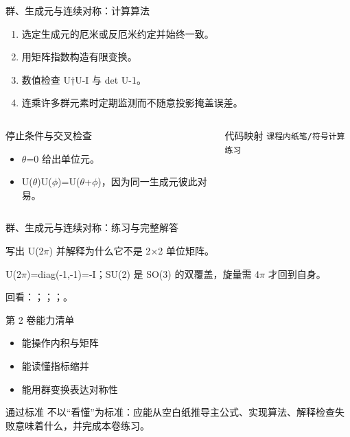 \begin{frame}[t]{群、生成元与连续对称：计算算法}
\footnotesize
{}\begin{enumerate}
\item 选定生成元的厄米或反厄米约定并始终一致。
\item 用矩阵指数构造有限变换。
\item 数值检查 U†U-I 与 det U-1。
\item 连乘许多群元素时定期监测而不随意投影掩盖误差。
\end{enumerate}\begin{columns}[T,onlytextwidth]
\begin{block}{停止条件与交叉检查}\scriptsize\begin{itemize}
\item[\CheckMark] \ensuremath{\theta}=0 给出单位元。
\item[\CheckMark] U(\ensuremath{\theta})U(\ensuremath{\phi})=U(\ensuremath{\theta}+\ensuremath{\phi})，因为同一生成元彼此对易。
\end{itemize}\end{block}
\begin{block}{代码映射}
\scriptsize \texttt{课程内纸笔/\allowbreak{}符号计算练习}
\end{block}\end{columns}\end{frame}

\begin{frame}[t]{群、生成元与连续对称：练习与完整解答}
\footnotesize
\begin{block}{}写出 U(2\ensuremath{\pi}) 并解释为什么它不是 2\ensuremath{\times}2 单位矩阵。\end{block}
\begin{exampleblock}{}U(2\ensuremath{\pi})=diag(-1,-1)=-I；SU(2) 是 SO(3) 的双覆盖，旋量需 4\ensuremath{\pi} 才回到自身。\end{exampleblock}
\vfill
\scriptsize 回看：；；；。
\end{frame}

\begin{frame}[t]{第 2 卷能力清单}
\small\begin{itemize}
\item[\CheckMark] 能操作内积与矩阵
\item[\CheckMark] 能读懂指标缩并
\item[\CheckMark] 能用群变换表达对称性
\end{itemize}\vfill\begin{block}{通过标准}
不以“看懂”为标准：应能从空白纸推导主公式、实现算法、解释检查失败意味着什么，并完成本卷练习。
\end{block}\end{frame}

